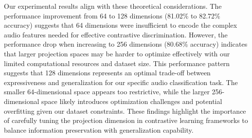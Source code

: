 \documentclass[11pt]{article}
\begin{document}
Our experimental results align with these theoretical considerations. The performance improvement from 64 to 128 dimensions (81.02\% to 82.72\% accuracy) suggests that 64 dimensions were insufficient to encode the complex audio features needed for effective contrastive discrimination. However, the performance drop when increasing to 256 dimensions (80.68\% accuracy) indicates that larger projection spaces may be harder to optimize effectively with our limited computational resources and dataset size. This performance pattern suggests that 128 dimensions represents an optimal trade-off between expressiveness and generalization for our specific audio classification task. The smaller 64-dimensional space appears too restrictive, while the larger 256-dimensional space likely introduces optimization challenges and potential overfitting given our dataset constraints. These findings highlight the importance of carefully tuning the projection dimension in contrastive learning frameworks to balance information preservation with generalization capability.
\end{document}
